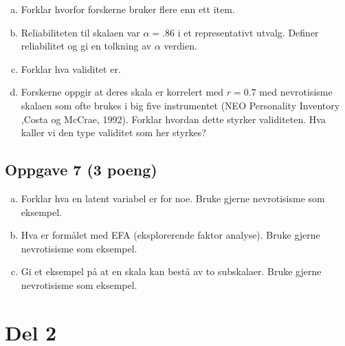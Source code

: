 \documentclass[12pt,a4paper, norsk]{article}
\begin{document}
	
	\begin{enumerate}[(a)]
	
	\item Forklar hvorfor forskerne bruker flere enn ett item. 
	
	\item Reliabiliteten til skalaen var $\alpha=.86$ i et representativt utvalg. Definer reliabilitet og gi en tolkning av $\alpha$ verdien. 
	
	\item Forklar hva validitet er. 
	
	\item Forskerne oppgir at deres skala er korrelert med $r=0.7$ med nevrotisisme skalaen som ofte brukes i big five instrumentet (NEO Personality Inventory ,Costa og McCrae, 1992). 
	Forklar hvordan dette styrker validiteten. Hva kaller vi den type validitet som her styrkes?
	
	
	
	
\end{enumerate}


\subsection*{Oppgave 7  (3 poeng) }

\begin{enumerate}[(a)]
	
	\item Forklar hva en latent variabel er for noe. Bruke gjerne nevrotisisme som eksempel. 
	
	\item Hva er formålet med EFA (eksplorerende faktor analyse). Bruke gjerne nevrotisisme som eksempel.
	
	\item Gi et eksempel på at en skala kan bestå av to subskalaer. Bruke gjerne nevrotisisme som eksempel.
	

	
	
	
\end{enumerate}



\section{Del 2} 







 
  
\end{document}
